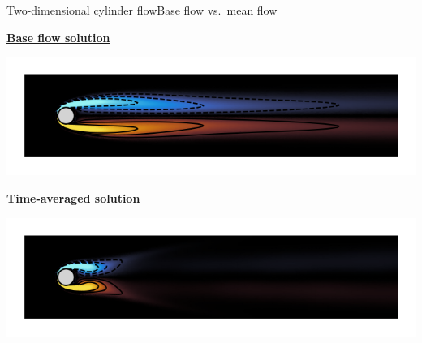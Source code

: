 \documentclass[usenames,dvipsnames,svgnames,10pt,aspectratio=169]{beamer}
\begin{document}
\begin{frame}[t, c]{Two-dimensional cylinder flow}{Base flow vs.\ mean flow}
  \begin{minipage}{.48\textwidth}
    \centering
    \underline{\textbf{Base flow solution}}

    \includegraphics[width=\textwidth]{baseflow}
  \end{minipage}%
  \hfill
  \begin{minipage}{.48\textwidth}
    \centering
    \underline{\textbf{Time-averaged solution}}

    \includegraphics[width=\textwidth]{mean_flow}
  \end{minipage}
\end{frame}
\end{document}
